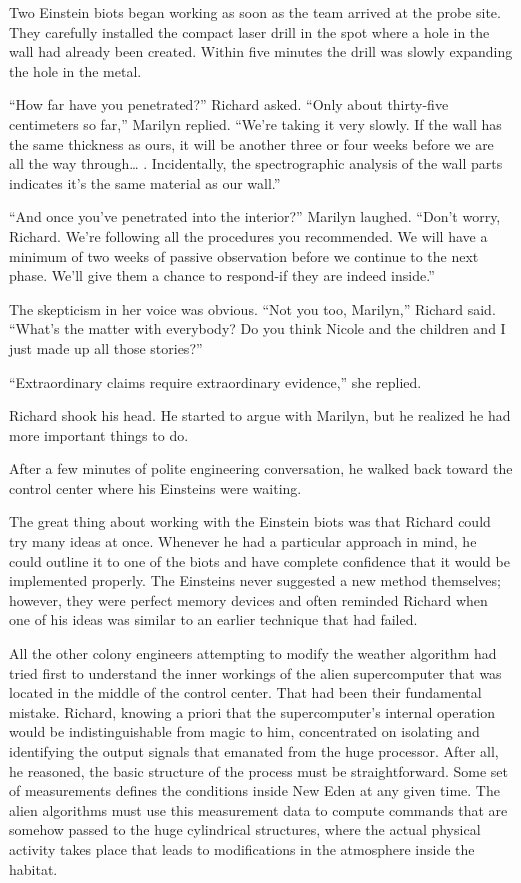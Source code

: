 \documentclass[]{article}
\begin{document}
{Two Einstein biots began working as soon as the team arrived at the probe site. They carefully installed the compact laser drill in the spot where a hole in the wall had already been created. Within five minutes the drill was slowly expanding the hole in the metal.

“How far have you penetrated?” Richard asked. “Only about thirty-five centimeters so far,” Marilyn replied. “We’re taking it very slowly. If the wall has the same thickness as ours, it will be another three or four weeks before we are all the way through… . Incidentally, the spectrographic analysis of the wall parts indicates it’s the same material as our wall.”

“And once you’ve penetrated into the interior?” Marilyn laughed. “Don’t worry, Richard. We’re following all the procedures you recommended. We will have a minimum of two weeks of passive observation before we continue to the next phase. We’ll give them a chance to respond-if they are indeed inside.”

The skepticism in her voice was obvious. “Not you too, Marilyn,” Richard said. “What’s the matter with everybody? Do you think Nicole and the children and I just made up all those stories?”

“Extraordinary claims require extraordinary evidence,” she replied.

Richard shook his head. He started to argue with Marilyn, but he realized he had more important things to do.

After a few minutes of polite engineering conversation, he walked back toward the control center where his Einsteins were waiting.

The great thing about working with the Einstein biots was that Richard could try many ideas at once. Whenever he had a particular approach in mind, he could outline it to one of the biots and have complete confidence that it would be implemented properly. The Einsteins never suggested a new method themselves; however, they were perfect memory devices and often reminded Richard when one of his ideas was similar to an earlier technique that had failed.

All the other colony engineers attempting to modify the weather algorithm had tried first to understand the inner workings of the alien supercomputer that was located in the middle of the control center. That had been their fundamental mistake. Richard, knowing a priori that the supercomputer’s internal operation would be indistinguishable from magic to him, concentrated on isolating and identifying the output signals that emanated from the huge processor. After all, he reasoned, the basic structure of the process must be straightforward. Some set of measurements defines the conditions inside New Eden at any given time. The alien algorithms must use this measurement data to compute commands that are somehow passed to the huge cylindrical structures, where the actual physical activity takes place that leads to modifications in the atmosphere inside the habitat.

}
\end{document}
